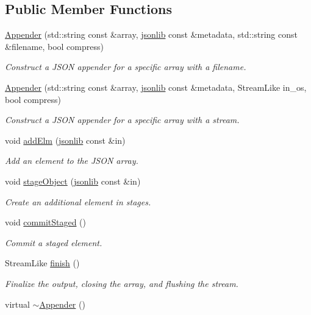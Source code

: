 \subsection*{Public Member Functions}
\begin{DoxyCompactItemize}
\item 
\hyperlink{structvt_1_1util_1_1json_1_1_appender_a1c8599740cd26db48663f7873e379405}{Appender} (std\+::string const \&array, \hyperlink{structvt_1_1util_1_1json_1_1_appender_aa822e25e24db1cdea96f00b79f55f492}{jsonlib} const \&metadata, std\+::string const \&filename, bool compress)
\begin{DoxyCompactList}\small\item\em Construct a J\+S\+ON appender for a specific array with a filename. \end{DoxyCompactList}\item 
\hyperlink{structvt_1_1util_1_1json_1_1_appender_a6c4107eaad1548aa4430e70fa2f7aea3}{Appender} (std\+::string const \&array, \hyperlink{structvt_1_1util_1_1json_1_1_appender_aa822e25e24db1cdea96f00b79f55f492}{jsonlib} const \&metadata, Stream\+Like in\+\_\+os, bool compress)
\begin{DoxyCompactList}\small\item\em Construct a J\+S\+ON appender for a specific array with a stream. \end{DoxyCompactList}\item 
void \hyperlink{structvt_1_1util_1_1json_1_1_appender_a003145544b1a6a9013d69217528d2f4e}{add\+Elm} (\hyperlink{structvt_1_1util_1_1json_1_1_appender_aa822e25e24db1cdea96f00b79f55f492}{jsonlib} const \&in)
\begin{DoxyCompactList}\small\item\em Add an element to the J\+S\+ON array. \end{DoxyCompactList}\item 
void \hyperlink{structvt_1_1util_1_1json_1_1_appender_a8ba476b4b652c43fe6eecbc887c5bb6f}{stage\+Object} (\hyperlink{structvt_1_1util_1_1json_1_1_appender_aa822e25e24db1cdea96f00b79f55f492}{jsonlib} const \&in)
\begin{DoxyCompactList}\small\item\em Create an additional element in stages. \end{DoxyCompactList}\item 
void \hyperlink{structvt_1_1util_1_1json_1_1_appender_a1bec71bb4129153f778b4ab5ef9a1fa2}{commit\+Staged} ()
\begin{DoxyCompactList}\small\item\em Commit a staged element. \end{DoxyCompactList}\item 
Stream\+Like \hyperlink{structvt_1_1util_1_1json_1_1_appender_ab56d332c2a9c5f051d58dbec6803b780}{finish} ()
\begin{DoxyCompactList}\small\item\em Finalize the output, closing the array, and flushing the stream. \end{DoxyCompactList}\item 
virtual \hyperlink{structvt_1_1util_1_1json_1_1_appender_afc07753487e15d62f981c195d0ba6b17}{$\sim$\+Appender} ()
\end{DoxyCompactItemize}
